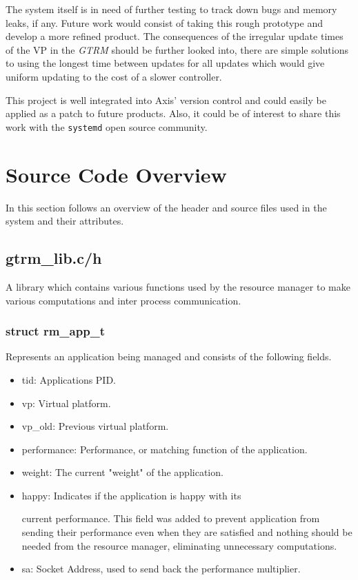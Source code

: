\documentclass[nobiblatex]{LTHthesis}
\begin{document}
The system itself is in need of further testing to track down bugs and
memory leaks, if any. Future work would consist of taking this rough
prototype and develop a more refined product. The consequences of the irregular update times of the VP
in the \emph{GTRM} should be further looked into, there are simple solutions to using the longest time 
between updates for all updates which would give uniform updating to the cost of a slower controller.


This project is well 
integrated into Axis' version control and could easily be applied as a 
patch to future products. Also, it could be of interest to share this 
work with the \texttt{systemd} open source community.





\appendix

\chapter{Source Code Overview}

In this section follows an overview of the header and source files used in the system and their attributes.

\section{gtrm\_lib.c/h}
A library which contains various functions used by the resource manager to make various computations and inter process communication.

\subsection{struct rm\_app\_t}
Represents an application being managed and consists of the following fields.
\begin{itemize}
\item tid: Applications PID.
\item vp: Virtual platform.
\item vp\_old: Previous virtual platform.
\item performance: Performance, or matching function of the application.
\item weight: The current "weight" of the application.
\item happy: Indicates if the application is happy with its 

      current performance. This field was added to prevent application from sending their performance even when they are satisfied and nothing should be needed from the resource manager, eliminating unnecessary computations.
\item sa: Socket Address, used to send back the performance multiplier.
\end{itemize}
\end{document}
